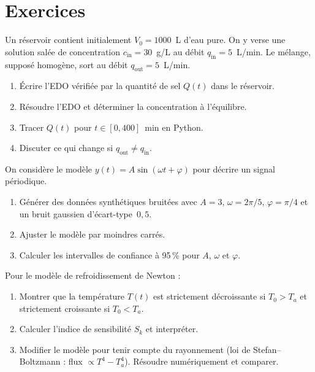 \section{Exercices}

\begin{exercice}
Un r\'eservoir contient initialement $V_0=1000$~L d'eau pure. On y
verse une solution sal\'ee de concentration $c_{\mathrm{in}}=30$~g/L
au d\'ebit $q_{\mathrm{in}}=5$~L/min.  Le m\'elange, suppos\'e homog\`ene,
sort au d\'ebit $q_{\mathrm{out}}=5$~L/min.

\begin{enumerate}
  \item \'Ecrire l'EDO v\'erifi\'ee par la quantit\'e de sel $Q(t)$ dans
    le r\'eservoir.
  \item R\'esoudre l'EDO et d\'eterminer la concentration \`a l'\'equilibre.
  \item Tracer $Q(t)$ pour $t\in[0,400]$~min en Python.
  \item Discuter ce qui change si $q_{\mathrm{out}}\neq q_{\mathrm{in}}$.
\end{enumerate}
\end{exercice}

\begin{exercice}
On consid\`ere le mod\`ele $y(t)=A\sin(\omega t+\varphi)$ pour
d\'ecrire un signal p\'eriodique.
\begin{enumerate}
  \item G\'en\'erer des donn\'ees synth\'etiques bruit\'ees avec
    $A=3$, $\omega=2\pi/5$, $\varphi=\pi/4$ et un bruit gaussien
    d'\'ecart-type~$0{,}5$.
  \item Ajuster le mod\`ele par moindres carr\'es.
  \item Calculer les intervalles de confiance \`a 95\,\% pour
    $A$, $\omega$ et $\varphi$.
\end{enumerate}
\end{exercice}

\begin{exercice}
Pour le mod\`ele de refroidissement de Newton :
\begin{enumerate}
  \item Montrer que la temp\'erature $T(t)$ est strictement d\'ecroissante
    si $T_0>T_a$ et strictement croissante si $T_0<T_a$.
  \item Calculer l'indice de sensibilit\'e $S_k$ et interpr\'eter.
  \item Modifier le mod\`ele pour tenir compte du rayonnement
    (loi de Stefan--Boltzmann : flux $\propto T^4 - T_a^4$).
    R\'esoudre num\'eriquement et comparer.
\end{enumerate}
\end{exercice}

